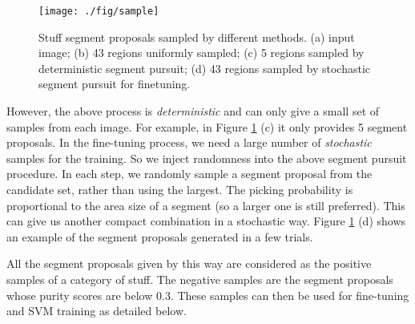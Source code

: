 \documentclass[10pt,twocolumn,letterpaper]{article}
\begin{document}
\begin{figure}[t]
  \centering
    \texttt{[image: ./fig/sample]}
  \caption{Stuff segment proposals sampled by different methods. (a) input image; (b) 43 regions uniformly sampled; (c) 5 regions sampled by deterministic segment pursuit; (d) 43 regions sampled by stochastic segment pursuit for finetuning.}
  \label{fig:biased_sampling}
\end{figure}

However, the above process is \emph{deterministic} and can only give a small set of samples from each image. For example, in Figure \ref{fig:biased_sampling} (c) it only provides 5 segment proposals.
In the fine-tuning process, we need a large number of \emph{stochastic} samples for the training. So we inject randomness into the above segment pursuit procedure. In each step, we randomly sample a segment proposal from the candidate set, rather than using the largest. The picking probability is proportional to the area size of a segment (so a larger one is still preferred). This can give us another compact combination in a stochastic way. Figure \ref{fig:biased_sampling} (d) shows an example of the segment proposals generated in a few trials.

All the segment proposals given by this way are considered as the positive samples of a category of stuff. The negative samples are the segment proposals whose purity scores are below 0.3. These samples can then be used for fine-tuning and SVM training as detailed below.
\end{document}
